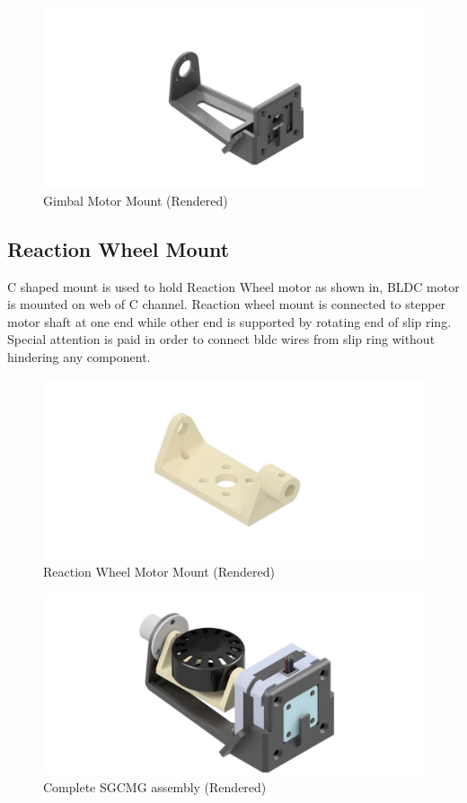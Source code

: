 \begin{figure}[ht]
    \centering
    \includegraphics[width=\textwidth]{figures/Assembly/STP_MOUNT.pdf}
    \caption{Gimbal Motor Mount (Rendered)}
    \label{fig:GMBL_MNT}
\end{figure}

\subsection{Reaction Wheel Mount}
C shaped mount is used to hold Reaction Wheel motor as shown in, BLDC motor is mounted on web of C channel. Reaction wheel mount is connected to stepper motor shaft at one end while other end is supported by rotating end of slip ring. Special attention is paid in order to connect \acrshort{bldc} wires from slip ring without hindering any component. 

\begin{figure}[ht]
    \centering
    \includegraphics[width=\textwidth]{figures/Assembly/rwMount.pdf}
    \caption{Reaction Wheel Motor Mount (Rendered)}
    \label{fig:RW_MNT}
\end{figure}

\begin{figure}[ht]
    \centering
    \includegraphics[width=\textwidth]{figures/Assembly/SGCMG.pdf}
    \caption{Complete SGCMG assembly (Rendered)}
    \label{fig:SGCMG_ASM}
\end{figure}


